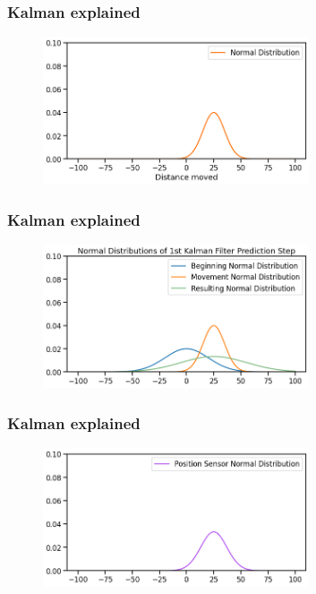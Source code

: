 \documentclass{beamer}
\begin{document}
\begin{frame}
    \frametitle{Kalman explained}
    \begin{figure}
        \centering
        \includegraphics[width=0.7\textwidth]{images/02_normal_distribution_after_move.png}
    \end{figure}
\end{frame}

\begin{frame}
    \frametitle{Kalman explained}
    \begin{figure}
        \centering
        \includegraphics[width=0.7\textwidth]{images/03_first_prediction.png}
    \end{figure}
\end{frame}


\begin{frame}
    \frametitle{Kalman explained}
    \begin{figure}
        \centering
        \includegraphics[width=0.7\textwidth]{images/04_measurement.png}
    \end{figure}
\end{frame}
\end{document}

